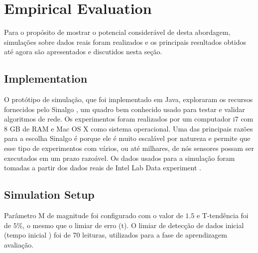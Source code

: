 \documentclass{acm_proc_article-sp}
\begin{document}
\section{Empirical Evaluation}
\label{eval}

Para o propósito de mostrar o potencial considerável de desta abordagem,
simulações sobre dados reais foram realizados e os principais resultados 
obtidos até agora são apresentados e discutidos nesta seção.

\subsection{Implementation}
\label{implementation}

O protótipo de simulação, que foi implementado em Java, exploraram os
recursos fornecidos pelo Sinalgo \cite{Sinalgo2007}, um quadro bem
conhecido usado para testar e validar algoritmos de rede. Os experimentos 
foram realizados por um computador i7 com 8 GB de RAM e Mac OS X como
sistema operacional. {Uma das principais razões para a escolha
Sinalgo é porque ele é muito escalável por natureza e permite que 
esse tipo de experimentos com vários, ou até milhares, de nós
sensores possam ser executados em um prazo razoável.}
Os dados usados para a simulação foram tomadas a partir dos dados
reais de Intel Lab Data experiment \cite{Intel2004}.

\subsection{Simulation Setup}
\label{data-and-experiments}

Parâmetro M de magnitude foi configurado com o valor de $1.5$ e
T-tendência foi de $5\%$, o mesmo que o limiar de erro (t).
O limiar de detecção de dados inicial (tempo inicial ) foi de 70 leituras,
utilizados para a fase de aprendizagem avaliação.
\vspace*{-.3cm}
\end{document}
